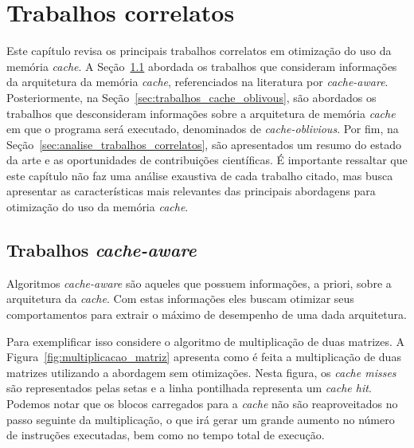 \chapter{Trabalhos correlatos}
\label{cap:trabalhos_correlatos}

Este capítulo revisa os principais trabalhos correlatos em otimização do uso da memória \textit{cache}.
A Seção~\ref{sec:trabalhos_cache_aware} abordada os trabalhos que consideram informações da arquitetura da memória \textit{cache}, referenciados na literatura por \textit{cache-aware}.
Posteriormente, na Seção~\ref{sec:trabalhos_cache_oblivous}, são abordados os trabalhos que desconsideram informações sobre a arquitetura de memória \textit{cache} em que o programa será executado, denominados de \textit{cache-oblivious}.
Por fim, na Seção~\ref{sec:analise_trabalhos_correlatos}, são apresentados um resumo do estado da arte e as oportunidades de contribuições científicas.
É importante ressaltar que este capítulo não faz uma análise exaustiva de cada trabalho citado, mas busca apresentar as características mais relevantes das principais abordagens para otimização do uso da memória \textit{cache}.

\section{Trabalhos \textit{cache-aware}}
\label{sec:trabalhos_cache_aware}

Algoritmos \textit{cache-aware} são aqueles que possuem informações, a priori, sobre a arquitetura da \textit{cache}.
Com estas informações eles buscam otimizar seus comportamentos para extrair o máximo de desempenho de uma dada arquitetura.

Para exemplificar isso considere o algoritmo de multiplicação de duas matrizes.   
A Figura~\ref{fig:multiplicacao_matriz} apresenta como é feita a multiplicação de duas matrizes utilizando a abordagem sem otimizações. Nesta figura, os \textit{cache misses} são representados pelas setas e a linha pontilhada representa um \textit{cache hit}. Podemos notar que os blocos carregados para a \textit{cache} não são reaproveitados no passo seguinte da multiplicação, o que irá gerar um grande aumento no número de instruções executadas, bem como no tempo total de execução.

